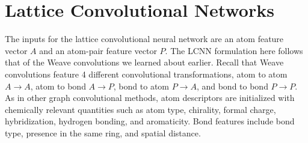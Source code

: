 \documentclass[book.tex]{subfiles}
\begin{document}







\section{Lattice Convolutional Networks}

The inputs for the lattice convolutional neural network are an atom feature vector $A$ and an atom-pair feature vector $P$. The LCNN formulation here follows that of the Weave convolutions \cite{kearnes2016molecular} we learned about earlier. Recall that Weave convolutions feature 4 different convolutional transformations, atom to atom $A\to A$, atom to bond $A \to P$, bond to atom $P \to A$, and bond to bond $P \to P$. As in other graph convolutional methods, atom descriptors are initialized with chemically relevant quantities such as atom type, chirality, formal charge, hybridization, hydrogen bonding, and aromaticity. Bond features include bond type, presence in the same ring, and spatial distance.
\end{document}
